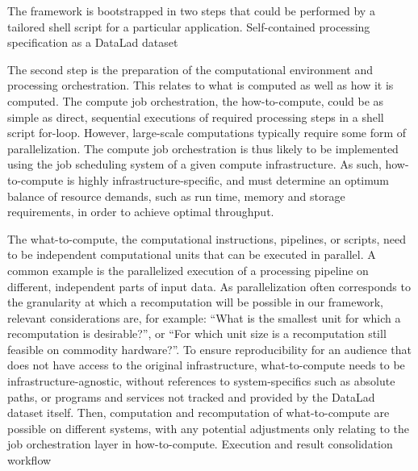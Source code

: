 The framework is bootstrapped in two steps that could be performed by a tailored shell script for a particular application.
Self-contained processing specification as a DataLad dataset



The second step is the preparation of the computational environment and processing orchestration. This relates to what is computed as well as how it is computed. The compute job orchestration, the how-to-compute, could be as simple as direct, sequential executions of required processing steps in a shell script for-loop. However, large-scale computations typically require some form of parallelization. The compute job orchestration is thus likely to be implemented using the job scheduling system of a given compute infrastructure. As such, how-to-compute is highly infrastructure-specific, and must determine an optimum balance of resource demands, such as run time, memory and storage requirements, in order to achieve optimal throughput.

The what-to-compute, the computational instructions, pipelines, or scripts, need to be independent computational units that can be executed in parallel. A common example is the parallelized execution of a processing pipeline on different, independent parts of input data. As parallelization often corresponds to the granularity at which a recomputation will be possible in our framework, relevant considerations are, for example: “What is the smallest unit for which a recomputation is desirable?”, or “For which unit size is a recomputation still feasible on commodity hardware?”. To ensure reproducibility for an audience that does not have access to the original infrastructure, what-to-compute needs to be infrastructure-agnostic, without references to system-specifics such as absolute paths, or programs and services not tracked and provided by the DataLad dataset itself. Then, computation and recomputation of what-to-compute are possible on different systems, with any potential adjustments only relating to the job orchestration layer in how-to-compute.
Execution and result consolidation workflow

